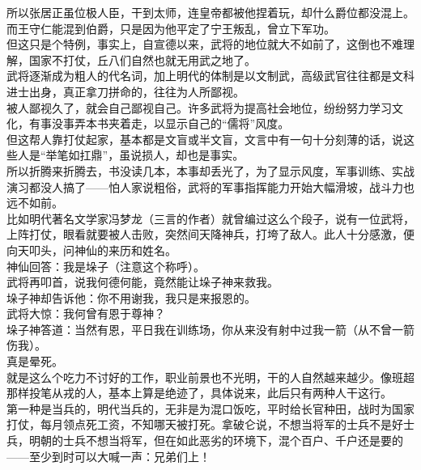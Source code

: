 \begin{multicols}{\theparacolNo}
所以张居正虽位极人臣，干到太师，连皇帝都被他捏着玩，却什么爵位都没混上。而王守仁能混到伯爵，只是因为他平定了宁王叛乱，曾立下军功。\\

但这只是个特例，事实上，自宣德以来，武将的地位就大不如前了，这倒也不难理解，国家不打仗，丘八们自然也就无用武之地了。\\

武将逐渐成为粗人的代名词，加上明代的体制是以文制武，高级武官往往都是文科进士出身，真正拿刀拼命的，往往为人所鄙视。\\

被人鄙视久了，就会自己鄙视自己。许多武将为提高社会地位，纷纷努力学习文化，有事没事弄本书夹着走，以显示自己的“儒将”风度。\\

但这帮人靠打仗起家，基本都是文盲或半文盲，文言中有一句十分刻薄的话，说这些人是“举笔如扛鼎”，虽说损人，却也是事实。\\

所以折腾来折腾去，书没读几本，本事却丢光了，为了显示风度，军事训练、实战演习都没人搞了——怕人家说粗俗，武将的军事指挥能力开始大幅滑坡，战斗力也远不如前。\\

比如明代著名文学家冯梦龙（三言的作者）就曾编过这么个段子，说有一位武将，上阵打仗，眼看就要被人击败，突然间天降神兵，打垮了敌人。此人十分感激，便向天叩头，问神仙的来历和姓名。\\

神仙回答：我是垛子（注意这个称呼）。\\

武将再叩首，说我何德何能，竟然能让垛子神来救我。\\

垛子神却告诉他：你不用谢我，我只是来报恩的。\\

武将大惊：我何曾有恩于尊神？\\

垛子神答道：当然有恩，平日我在训练场，你从来没有射中过我一箭（从不曾一箭伤我）。\\

真是晕死。\\

就是这么个吃力不讨好的工作，职业前景也不光明，干的人自然越来越少。像班超那样投笔从戎的人，基本上算是绝迹了，具体说来，此后只有两种人干这行。\\

第一种是当兵的，明代当兵的，无非是为混口饭吃，平时给长官种田，战时为国家打仗，每月领点死工资，不知哪天被打死。拿破仑说，不想当将军的士兵不是好士兵，明朝的士兵不想当将军，但在如此恶劣的环境下，混个百户、千户还是要的——至少到时可以大喊一声：兄弟们上！\\


\end{multicols}
